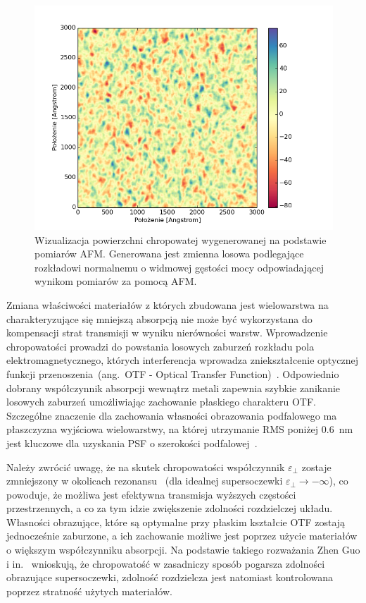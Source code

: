 \begin{figure}[bt]
		\includegraphics[width=\textwidth]{images/multilayer/ag30nm-afm-generated.png}
		\caption{Wizualizacja powierzchni chropowatej wygenerowanej na podstawie pomiarów AFM. Generowana jest zmienna losowa podlegające rozkładowi normalnemu o widmowej gęstości mocy odpowiadającej wynikom pomiarów za pomocą AFM.} 
		\label{fig:ag30nm-afmgene}
\end{figure}


Zmiana właściwości materiałów z których zbudowana jest wielowarstwa na charakteryzujące się mniejszą absorpcją nie może być wykorzystana do kompensacji strat transmisji w wyniku nierówności warstw. Wprowadzenie chropowatości prowadzi do powstania losowych zaburzeń rozkładu pola elektromagnetycznego, których interferencja wprowadza zniekształcenie optycznej funkcji przenoszenia~(ang.~OTF - Optical Transfer Function)~\cite{citeulike:2926459}. Odpowiednio dobrany współczynnik absorpcji wewnątrz metali zapewnia szybkie zanikanie losowych zaburzeń umożliwiając zachowanie płaskiego charakteru OTF. Szczególne znaczenie dla zachowania własności obrazowania podfalowego ma płaszczyzna wyjściowa wielowarstwy, na której utrzymanie RMS poniżej $0.6$~nm jest kluczowe dla uzyskania PSF o szerokości podfalowej~\cite{guo2014negative}.

Należy zwrócić uwagę, że na skutek chropowatości współczynnik $\varepsilon_{\perp}$ zostaje zmniejszony w okolicach rezonansu~\cite{guo2014negative} (dla idealnej supersoczewki $\varepsilon_{\perp} \to - \infty$), co powoduje, że możliwa jest efektywna transmisja wyższych częstości przestrzennych, a co za tym idzie zwiększenie zdolności rozdzielczej układu. Własności obrazujące, które są optymalne przy płaskim kształcie OTF zostają jednocześnie zaburzone, a ich zachowanie możliwe jest poprzez użycie materiałów o większym współczynniku absorpcji. Na podstawie takiego rozważania Zhen Guo i in.~\cite{guo2014negative} wnioskują, że chropowatość w zasadniczy sposób pogarsza zdolności obrazujące supersoczewki, zdolność rozdzielcza jest natomiast kontrolowana poprzez stratność użytych materiałów.

